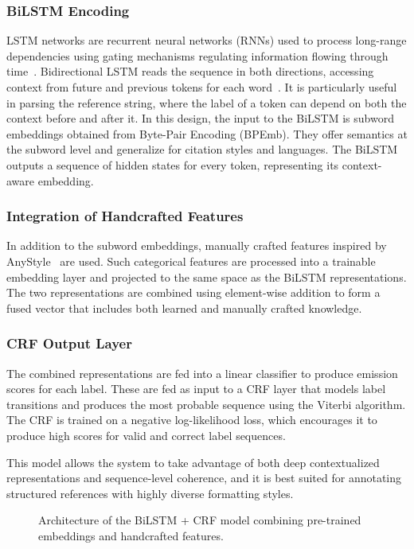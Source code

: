 \subsubsection{BiLSTM Encoding}
LSTM networks are recurrent neural networks (RNNs) used to process long-range dependencies using gating mechanisms regulating information flowing through time~\cite{lstm}. Bidirectional LSTM reads the sequence in both directions, accessing context from future and previous tokens for each word~\cite{bilstm}. It is particularly useful in parsing the reference string, where the label of a token can depend on both the context before and after it.
In this design, the input to the BiLSTM is subword embeddings obtained from Byte-Pair Encoding (BPEmb). They offer semantics at the subword level and generalize for citation styles and languages. The BiLSTM outputs a sequence of hidden states for every token, representing its context-aware embedding.

\subsubsection{Integration of Handcrafted Features}
In addition to the subword embeddings, manually crafted features inspired by AnyStyle~\cite{anystyle} are used. Such categorical features are processed into a trainable embedding layer and projected to the same space as the BiLSTM representations. The two representations are combined using element-wise addition to form a fused vector that includes both learned and manually crafted knowledge.

\subsubsection{CRF Output Layer}
The combined representations are fed into a linear classifier to produce emission scores for each label. These are fed as input to a CRF layer that models label transitions and produces the most probable sequence using the Viterbi algorithm. The CRF is trained on a negative log-likelihood loss, which encourages it to produce high scores for valid and correct label sequences.

This model allows the system to take advantage of both deep contextualized representations and sequence-level coherence, and it is best suited for annotating structured references with highly diverse formatting styles.

\begin{figure}[ht]
    \centering
    
    \caption[BiLSTM + CRF Model Architecture]{Architecture of the BiLSTM + CRF model combining pre-trained embeddings and handcrafted features.}
    \label{fig:bilstm-crf-architecture}
\end{figure}
